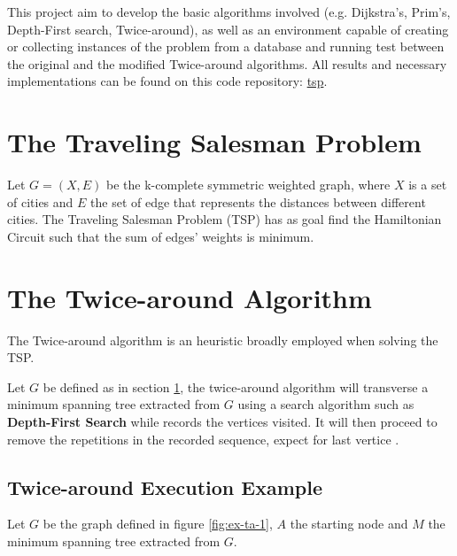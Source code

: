 \documentclass[journal]{IEEEtran}
\begin{document}
This project aim to develop the basic algorithms involved (e.g. Dijkstra's, Prim's, Depth-First search, Twice-around), as well as an environment capable of creating or collecting instances of the problem from a database and running test between the original and the modified Twice-around algorithms. All results and necessary implementations can be found on this code repository: \href{https://github.com/lucasdavid/tsp}{tsp}.

\section{The Traveling Salesman Problem}
\label{s:tsp}

Let $G=(X, E)$ be the k-complete symmetric weighted graph, where $X$ is a set of cities and $E$ the set of edge that represents the distances between different cities. The Traveling Salesman Problem (TSP) has as goal find the Hamiltonian Circuit such that the sum of edges' weights is minimum.

\section{The Twice-around Algorithm}

The Twice-around algorithm is an heuristic broadly employed when solving the TSP. 

Let $G$ be defined as in section \ref{s:tsp}, the twice-around algorithm will transverse a minimum spanning tree extracted from $G$ using a search algorithm such as \textbf{Depth-First Search} while records the vertices visited. It will then proceed to remove the repetitions in the recorded sequence, expect for last vertice \cite{nilsson}.

\subsection{Twice-around Execution Example}

Let $G$ be the graph defined in figure \ref{fig:ex-ta-1}, $A$ the starting node and $M$ the minimum spanning tree extracted from $G$.
\end{document}
